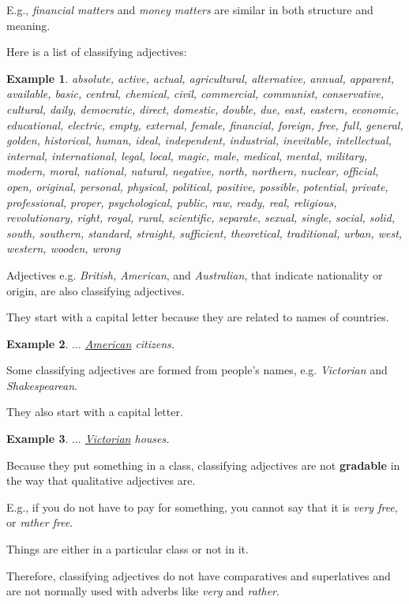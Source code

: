 \documentclass[oneside]{book}
\numberwithin{equation}{section}
\newtheorem{example}{Example}[section]
\begin{document}
E.g., \textit{financial matters} and \textit{money matters} are similar in both structure and meaning.

%
Here is a list of classifying adjectives:
\begin{example}
    absolute, active, actual, agricultural, alternative, annual, apparent, available, basic, central, chemical, civil, commercial, communist, conservative, cultural, daily, democratic, direct, domestic, double, due, east, eastern, economic, educational, electric, empty, external, female, financial, foreign, free, full, general, golden, historical, human, ideal, independent, industrial, inevitable, intellectual, internal, international, legal, local, magic, male, medical, mental, military, modern, moral, national, natural, negative, north, northern, nuclear, official, open, original, personal, physical, political, positive, possible, potential, private, professional, proper, psychological, public, raw, ready, real, religious, revolutionary, right, royal, rural, scientific, separate, sexual, single, social, solid, south, southern, standard, straight, sufficient, theoretical, traditional, urban, west, western, wooden, wrong
\end{example}
%
\noindent{} Adjectives e.g. \textit{British, American}, and \textit{Australian}, that indicate nationality or origin, are also classifying adjectives.

They start with a capital letter because they are related to names of countries.
\begin{example}
    $\ldots$ \underline{American} citizens.
\end{example}
Some classifying adjectives are formed from people's names, e.g. \textit{Victorian} and \textit{Shakespearean}.

They also start with a capital letter.
\begin{example}
    $\ldots$ \underline{Victorian} houses.
\end{example}
%
\noindent{} Because they put something in a class, classifying adjectives are not \textbf{gradable} in the way that qualitative adjectives are.

E.g., if you do not have to pay for something, you cannot say that it is \textit{very free}, or \textit{rather free}.

Things are either in a particular class or not in it.

Therefore, classifying adjectives do not have comparatives and superlatives and are not normally used with adverbs like \textit{very} and \textit{rather}.
\end{document}
